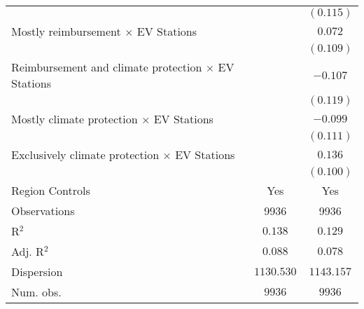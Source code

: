 \begin{center}
\begin{tiny}
\begin{longtable}{l@{} c@{} c@{}}
                                                                                                       &                  & $(0.115)$        \\
\quad Mostly reimbursement $\times$ EV Stations                                                        &                  & $0.072$          \\
                                                                                                       &                  & $(0.109)$        \\
\quad Reimbursement and climate protection $\times$ EV Stations                                        &                  & $-0.107$         \\
                                                                                                       &                  & $(0.119)$        \\
\quad Mostly climate protection $\times$ EV Stations                                                   &                  & $-0.099$         \\
                                                                                                       &                  & $(0.111)$        \\
\quad Exclusively climate protection $\times$ EV Stations                                              &                  & $0.136$          \\
                                                                                                       &                  & $(0.100)$        \\
\hline
Region Controls                                                                                        & Yes              & Yes              \\
Observations                                                                                           & 9936             & 9936             \\
R$^2$                                                                                                  & $0.138$          & $0.129$          \\
Adj. R$^2$                                                                                             & $0.088$          & $0.078$          \\
Dispersion                                                                                             & $1130.530$       & $1143.157$       \\
Num. obs.                                                                                              & $9936$           & $9936$           \\
\end{longtable}
\end{tiny}
\end{center}
